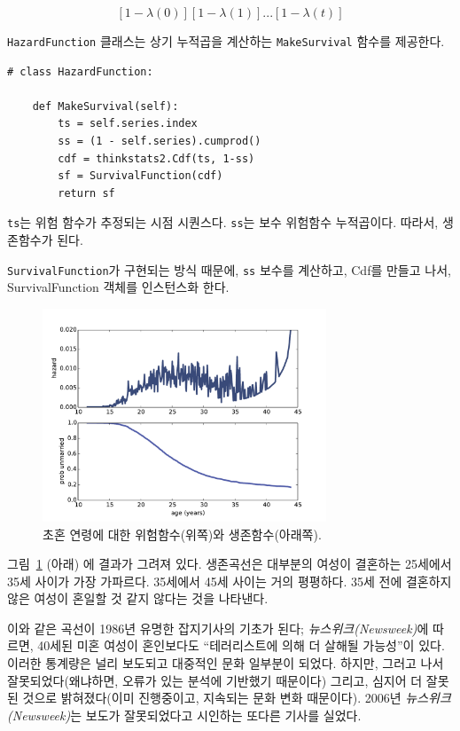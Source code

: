 %
\[ [1-\lambda(0)] [1-\lambda(1)] ... [1-\lambda(t)] \]
%

{\tt HazardFunction} 클래스는 상기 누적곱을 계산하는 {\tt MakeSurvival} 함수를 제공한다.

\begin{verbatim}
# class HazardFunction:

    def MakeSurvival(self):
        ts = self.series.index
        ss = (1 - self.series).cumprod()
        cdf = thinkstats2.Cdf(ts, 1-ss)
        sf = SurvivalFunction(cdf)
        return sf
\end{verbatim}

{\tt ts}는 위험 함수가 추정되는 시점 시퀀스다.
{\tt ss}는 보수 위험함수 누적곱이다. 따라서, 생존함수가 된다.

{\tt SurvivalFunction}가 구현되는 방식 때문에, {\tt ss} 보수를 계산하고, Cdf를 만들고 나서, SurvivalFunction 객체를 인스턴스화 한다.


\begin{figure}
\centerline{\includegraphics[height=2.5in]{figs/survival2.pdf}}
\caption{초혼 연령에 대한 위험함수(위쪽)와 생존함수(아래쪽).}
\label{survival2}
\end{figure}

그림~\ref{survival2} (아래) 에 결과가 그려져 있다.
생존곡선은 대부분의 여성이 결혼하는 25세에서 35세 사이가 가장 가파르다.
35세에서 45세 사이는 거의 평평하다. 35세 전에 결혼하지 않은 여성이 혼일할 것 같지 않다는 것을 나타낸다.

이와 같은 곡선이 1986년 유명한 잡지기사의 기초가 된다; {\it 뉴스위크(Newsweek)}에 따르면, 40세된 미혼 여성이 혼인보다도 ``테러리스트에 의해 더 살해될 가능성''이 있다. 이러한 통계량은 널리 보도되고 대중적인 문화 일부분이 되었다. 하지만, 그러고 나서 잘못되었다(왜냐하면, 오류가 있는 분석에 기반했기 때문이다) 그리고, 심지어 더 잘못된 것으로 밝혀졌다(이미 진행중이고, 지속되는 문화 변화 때문이다). 2006년 {\it 뉴스위크(Newsweek)}는 보도가 잘못되었다고 시인하는 또다른 기사를 실었다.

